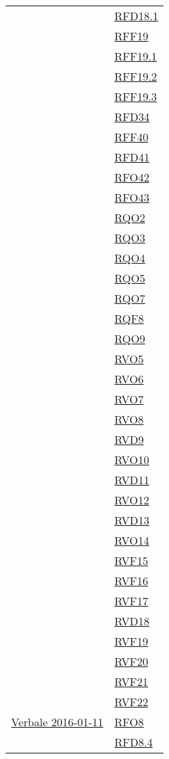 \begin{longtable}{|>{\centering}m{5cm}|m{5cm}<{\centering}|}
& \hyperlink{RFD18.1}{RFD18.1}\\
& \hyperlink{RFF19}{RFF19}\\
& \hyperlink{RFF19.1}{RFF19.1}\\
& \hyperlink{RFF19.2}{RFF19.2}\\
& \hyperlink{RFF19.3}{RFF19.3}\\
& \hyperlink{RFD34}{RFD34}\\
& \hyperlink{RFF40}{RFF40}\\
& \hyperlink{RFD41}{RFD41}\\
& \hyperlink{RFO42}{RFO42}\\
& \hyperlink{RFO43}{RFO43}\\
& \hyperlink{RQO2}{RQO2}\\
& \hyperlink{RQO3}{RQO3}\\
& \hyperlink{RQO4}{RQO4}\\
& \hyperlink{RQO5}{RQO5}\\
& \hyperlink{RQO7}{RQO7}\\
& \hyperlink{RQF8}{RQF8}\\
& \hyperlink{RQO9}{RQO9}\\
& \hyperlink{RVO5}{RVO5}\\
& \hyperlink{RVO6}{RVO6}\\
& \hyperlink{RVO7}{RVO7}\\
& \hyperlink{RVO8}{RVO8}\\
& \hyperlink{RVD9}{RVD9}\\
& \hyperlink{RVO10}{RVO10}\\
& \hyperlink{RVD11}{RVD11}\\
& \hyperlink{RVO12}{RVO12}\\
& \hyperlink{RVD13}{RVD13}\\
& \hyperlink{RVO14}{RVO14}\\
& \hyperlink{RVF15}{RVF15}\\
& \hyperlink{RVF16}{RVF16}\\
& \hyperlink{RVF17}{RVF17}\\
& \hyperlink{RVD18}{RVD18}\\
& \hyperlink{RVF19}{RVF19}\\
& \hyperlink{RVF20}{RVF20}\\
& \hyperlink{RVF21}{RVF21}\\
& \hyperlink{RVF22}{RVF22}\\ \hline
\hyperlink{Verbale 2016-01-11}{Verbale 2016-01-11} & \hyperlink{RFO8}{RFO8}\\
& \hyperlink{RFD8.4}{RFD8.4}\\

\end{longtable}
